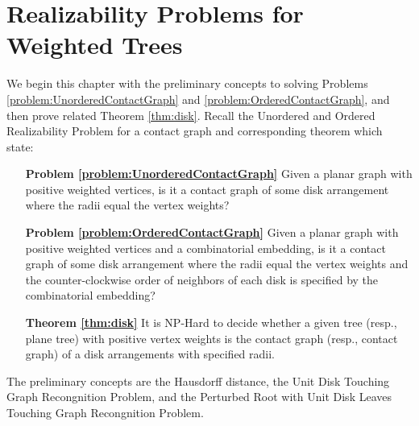 \chapter{Realizability Problems for Weighted Trees}\label{chp:disk}

We begin this chapter with the preliminary concepts to solving Problems \ref{problem:UnorderedContactGraph} and \ref{problem:OrderedContactGraph}, and then prove related Theorem \ref{thm:disk}.
Recall the Unordered and Ordered Realizability Problem  for a contact graph  and corresponding theorem which state:

\begin{itemize}
\item[\textbf{Problem \ref{problem:UnorderedContactGraph}}] Given a planar graph with positive weighted vertices, is it a contact graph of some disk arrangement where the radii equal the vertex weights?
\item[\textbf{Problem \ref{problem:OrderedContactGraph}}] Given a planar graph with positive weighted vertices and a combinatorial embedding, is it a contact graph of some disk arrangement where the radii equal the vertex weights and the counter-clockwise order of neighbors of each disk is specified by the combinatorial embedding?
\item[\textbf{Theorem \ref{thm:disk}}] It is NP-Hard to decide whether a given tree (resp., plane tree) with positive vertex weights
is the contact graph (resp., contact graph) of a disk arrangements with specified radii.
\end{itemize}

The preliminary concepts are the Hausdorff distance, the Unit Disk Touching Graph Recongnition Problem, and the Perturbed Root with Unit Disk Leaves Touching Graph Recongnition Problem.